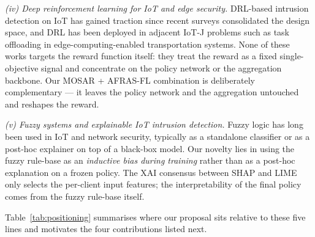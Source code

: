 \documentclass[ai,article,submit,moreauthors,pdftex]{Definitions/mdpi}
\begin{document}
\emph{(iv) Deep reinforcement learning for IoT and edge security.}
DRL-based intrusion detection on IoT has gained traction since
recent surveys consolidated the design
space\cite{kaur2024intrusion,layeghy2024privacy}, and DRL has been
deployed in adjacent IoT-J problems such as task offloading in
edge-computing-enabled transportation
systems\cite{xu2024transedge}. None of these works targets the
reward function itself: they treat the reward as a fixed
single-objective signal and concentrate on the policy network or
the aggregation backbone. Our MOSAR + AFRAS-FL combination is
deliberately complementary --- it leaves the policy network and
the aggregation untouched and reshapes the reward.

\emph{(v) Fuzzy systems and explainable IoT intrusion detection.}
Fuzzy logic has long been used in IoT and network security,
typically as a standalone classifier or as a post-hoc explainer on
top of a black-box model\cite{lundberg2017shap,ribeiro2016lime,
arrieta2020xai,abdulrahman2024xai_ids,bouacida2024flids_survey,
zahir2025fl_ids_acm}. Our novelty lies in using the fuzzy
rule-base as an \emph{inductive bias during training} rather than
as a post-hoc explanation on a frozen policy. The XAI consensus
between SHAP\cite{lundberg2017shap} and
LIME\cite{ribeiro2016lime} only selects the per-client input
features; the interpretability of the final policy comes from the
fuzzy rule-base itself.

Table~\ref{tab:positioning} summarises where our proposal sits
relative to these five lines and motivates the four contributions
listed next.
\end{document}
